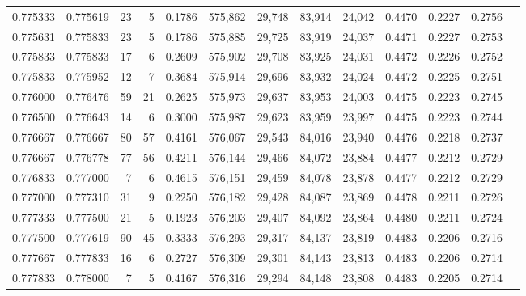 \begin{tabular}{rrrrrrrrrrrrr}
0.775333 & 0.775619 &    23 &   5 &                                     0.1786 & 575,862 &  29,748 &  83,914 &  24,042 & 0.4470 & 0.2227 & 0.2756 \\
0.775631 & 0.775833 &    23 &   5 &                                     0.1786 & 575,885 &  29,725 &  83,919 &  24,037 & 0.4471 & 0.2227 & 0.2753 \\
0.775833 & 0.775833 &    17 &   6 &                                     0.2609 & 575,902 &  29,708 &  83,925 &  24,031 & 0.4472 & 0.2226 & 0.2752 \\
0.775833 & 0.775952 &    12 &   7 &                                     0.3684 & 575,914 &  29,696 &  83,932 &  24,024 & 0.4472 & 0.2225 & 0.2751 \\
0.776000 & 0.776476 &    59 &  21 &                                     0.2625 & 575,973 &  29,637 &  83,953 &  24,003 & 0.4475 & 0.2223 & 0.2745 \\
0.776500 & 0.776643 &    14 &   6 &                                     0.3000 & 575,987 &  29,623 &  83,959 &  23,997 & 0.4475 & 0.2223 & 0.2744 \\
0.776667 & 0.776667 &    80 &  57 &                                     0.4161 & 576,067 &  29,543 &  84,016 &  23,940 & 0.4476 & 0.2218 & 0.2737 \\
0.776667 & 0.776778 &    77 &  56 &                                     0.4211 & 576,144 &  29,466 &  84,072 &  23,884 & 0.4477 & 0.2212 & 0.2729 \\
0.776833 & 0.777000 &     7 &   6 &                                     0.4615 & 576,151 &  29,459 &  84,078 &  23,878 & 0.4477 & 0.2212 & 0.2729 \\
0.777000 & 0.777310 &    31 &   9 &                                     0.2250 & 576,182 &  29,428 &  84,087 &  23,869 & 0.4478 & 0.2211 & 0.2726 \\
0.777333 & 0.777500 &    21 &   5 &                                     0.1923 & 576,203 &  29,407 &  84,092 &  23,864 & 0.4480 & 0.2211 & 0.2724 \\
0.777500 & 0.777619 &    90 &  45 &                                     0.3333 & 576,293 &  29,317 &  84,137 &  23,819 & 0.4483 & 0.2206 & 0.2716 \\
0.777667 & 0.777833 &    16 &   6 &                                     0.2727 & 576,309 &  29,301 &  84,143 &  23,813 & 0.4483 & 0.2206 & 0.2714 \\
0.777833 & 0.778000 &     7 &   5 &                                     0.4167 & 576,316 &  29,294 &  84,148 &  23,808 & 0.4483 & 0.2205 & 0.2714 \\

\end{tabular}

